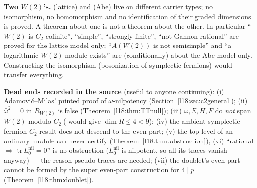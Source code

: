 \begin{warning}
\textbf{Two $W(2)$'s.}  (lattice) and  (Abe) live on different carrier
types; no isomorphism, no homomorphism and no identification of their graded dimensions is proved. A theorem about
one is not a theorem about the other. In particular ``$W(2)$ is $C_2$-cofinite'', ``simple'', ``strongly finite'', ``not
Gannon-rational'' are proved for the lattice model only; ``$A(W(2))$ is not semisimple'' and ``a logarithmic
$W(2)$-module exists'' are (conditionally) about the Abe model only. Constructing the isomorphism (bosonization of
symplectic fermions) would transfer everything.
\end{warning}

\begin{warning}
\textbf{Dead ends recorded in the source} (useful to anyone continuing): (i) Adamovi\'c--Milas' printed proof of
$\bar\omega$-nilpotency (Section~\ref{l18:sec:c2general}); (ii) $\bar\omega^2=0$ in $R_{W(2)}$ is false
(Theorem~\ref{l18:thm:TTnull}); (iii) $\omega,E,H,F$ do \emph{not} span $W(2)$ modulo $C_2$ ( would give
$\dim R\le4<9$); (iv) the ambient symplectic-fermion $C_2$ result does not descend to the even part; (v) the top level of
an ordinary module can never certify  (Theorem~\ref{l18:thm:obstruction}); (vi) ``rational $\Rightarrow$
$\mathrm{tr}\,L_0^{\mathrm{nil}}=0$'' is no obstruction ($L_0^{\mathrm{nil}}$ is nilpotent, so all its traces vanish anyway) --- the
reason pseudo-traces are needed; (vii) the doublet's even part cannot be formed by the super even-part construction for
$4\mid p$ (Theorem~\ref{l18:thm:doublet}).
\end{warning}

